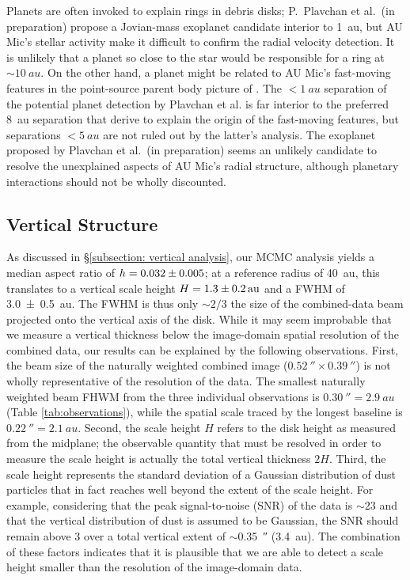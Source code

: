\documentclass[modern]{aastex62}
\begin{document}
Planets are often invoked to explain rings in debris disks; P.~Plavchan et al.~(in preparation) propose a Jovian-mass exoplanet candidate interior to \SI{1}{au}, but AU Mic's stellar activity make it difficult to confirm the radial velocity detection.
It is unlikely that a planet so close to the star would be responsible for a ring at $\sim\SI{10}{au}$.
On the other hand, a planet might be related to AU Mic's fast-moving features in the point-source parent body picture of \citet{sezestre17}.
The $< \SI{1}{au}$ separation of the potential planet detection by Plavchan et al. is far interior to the preferred \SI{8}{au} separation that \citet{sezestre17} derive to explain the origin of the fast-moving features, but separations $< \SI{5}{au}$ are not ruled out by the latter's analysis.
The exoplanet proposed by Plavchan et al.~(in preparation) seems an unlikely candidate to resolve the unexplained aspects of AU Mic's radial structure, although planetary interactions should not be wholly discounted.

\subsection{Vertical Structure}
\label{subsection: vertical discussion}

As discussed in \S \ref{subsection: vertical analysis}, our MCMC analysis yields a median aspect ratio of $h=\num{0.032 \pm 0.005}$; at a reference radius of \SI{40}{au}, this translates to a vertical scale height $H = \SI{1.3 \pm 0.2}{au}$ and a FWHM of \SI{3.0 \pm 0.5}{au}.
The FWHM is thus only $\sim 2/3$ the size of the combined-data beam projected onto the vertical axis of the disk.
While it may seem improbable that we measure a vertical thickness below the image-domain spatial resolution of the combined data, our results can be explained by the following observations.
First, the beam size of the naturally weighted combined image ($\SI{0.52}{\arcsecond} \times \SI{0.39}{\arcsecond}$) is not wholly representative of the resolution of the data. 
The smallest naturally weighted beam FHWM from the three individual observations is $\SI{0.30}{\arcsecond} = \SI{2.9}{au}$ (Table \ref{tab:observations}), while the spatial scale traced by the longest baseline is $\SI{0.22}{\arcsecond} = \SI{2.1}{au}$.
Second, the scale height $H$ refers to the disk height as measured from the midplane; the observable quantity that must be resolved in order to measure the scale height is actually the total vertical thickness $2H$.
Third, the scale height represents the standard deviation of a Gaussian distribution of dust particles that in fact reaches well beyond the extent of the scale height.
For example, considering that the peak signal-to-noise (SNR) of the data is $\sim 23$ and that the vertical distribution of dust is assumed to be Gaussian, the SNR should remain above 3 over a total vertical extent of $\sim$\SI{0.35}{\arcsecond} (\SI{3.4}{au}). 
The combination of these factors indicates that it is plausible that we are able to detect a scale height smaller than the resolution of the image-domain data.
\end{document}
